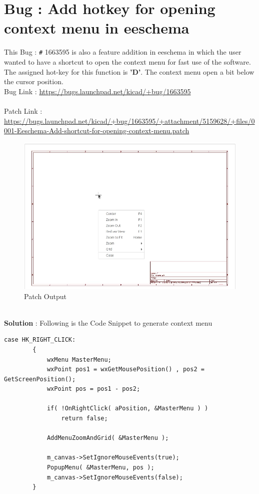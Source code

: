 \documentclass[12pt,a4paper]{report}
\begin{document}
\section{Bug : Add hotkey for opening context menu in eeschema}
This Bug : \verb!#! 1663595 is also a feature addition in eeschema in which the user wanted to have a shortcut to open the context menu for fast use of the software. The assigned hot-key for this function is \textbf{'D'}. The context menu open a bit below the cursor position.
\vspace{3mm}
\\
Bug Link : \url{https://bugs.launchpad.net/kicad/+bug/1663595}
\\
\\
Patch Link : \url{https://bugs.launchpad.net/kicad/+bug/1663595/+attachment/5159628/+files/0001-Eeschema-Add-shortcut-for-opening-context-menu.patch}
\begin{figure}[h]
	\centering
	\includegraphics[scale=0.3]{ki_bug_2}
	\caption{Patch Output}
\end{figure}
\\
\textbf{Solution} : Following is the Code Snippet to generate context menu
\begin{verbatim}
case HK_RIGHT_CLICK:
        {
            wxMenu MasterMenu;
            wxPoint pos1 = wxGetMousePosition() , pos2 = GetScreenPosition();
            wxPoint pos = pos1 - pos2;

            if( !OnRightClick( aPosition, &MasterMenu ) )
                return false;

            AddMenuZoomAndGrid( &MasterMenu );

            m_canvas->SetIgnoreMouseEvents(true);
            PopupMenu( &MasterMenu, pos );
            m_canvas->SetIgnoreMouseEvents(false);
        }
\end{verbatim}
\end{document}

